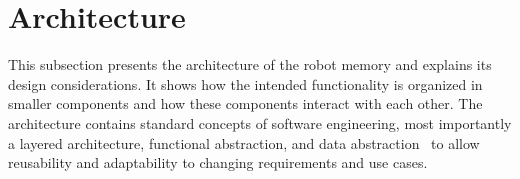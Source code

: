 \section{Architecture}
\label{sec:arch}
This subsection presents the architecture of the robot memory and
explains its design considerations. It shows how the intended
functionality is organized in smaller components and how these
components interact with each other. The architecture contains
standard concepts of software engineering, most importantly a layered
architecture, functional abstraction, and data
abstraction~\cite{software-architecture} to allow
reusability and adaptability to changing requirements and use cases.

